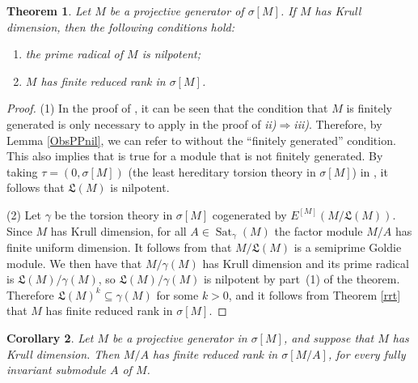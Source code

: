 \documentclass{amsart}
\newtheorem{thm}{Theorem}[section]
\newtheorem{cor}[thm]{Corollary}
\theoremstyle{definition}
\theoremstyle{remark}
\numberwithin{equation}{section}
\DeclareMathOperator{\Sat}{Sat}
\newcommand{\sm}{\sigma[M]}
\begin{document}
	\begin{thm}\label{Knil}
		Let $M$ be a projective generator of $\sm$. 
		If $M$ has Krull dimension,
		then the following conditions hold:
		\begin{enumerate}
			\item the prime radical of $M$ is nilpotent;
			\item $M$ has finite reduced rank in $\sm$.
		\end{enumerate}
	\end{thm}
	
	\begin{proof}
		(1)
		In the proof of \cite[Theorem 2.16]{Pepenil}, 
		it can be seen that the condition that $M$ is finitely generated 
		is only necessary to apply \cite[Lemma 2.14]{Pepenil} 
		in the proof of \textit{ii)}$\Rightarrow$\textit{iii)}. 
		Therefore, by Lemma \ref{ObsPPnil}, 
		we can refer to \cite[Theorem 2.16]{Pepenil} 
		without the ``finitely generated'' condition. 
		This also implies that \cite[Theorem 3.10]{Pepenil} 
		is true for a module that is not finitely generated. 
		By taking $\tau=(0,\sm)$ 
		(the least hereditary torsion theory in $\sm$) 
		in \cite[Theorem 3.10]{Pepenil}, 
		it follows that $\mathfrak{L} (M)$ is nilpotent.
		
		(2)
		Let $\gamma$ be the torsion theory in $\sm$ 
		cogenerated by $E^{[M]}(M/\mathfrak{L}(M))$. 
		Since $M$ has Krull dimension, 
		for all $A\in\Sat_\gamma(M)$ 
		the factor module $M/A$ has finite uniform dimension.
		It follows from \cite[Corollary 2.12]{maugoldie} 
		that $M/\mathfrak{L}(M)$ is a semiprime Goldie module. 
		We then have that $M/\gamma(M)$ has Krull dimension 
		and its prime radical is $\mathfrak{L}(M)/\gamma(M)$, 
		so $\mathfrak{L}(M)/\gamma(M)$ is nilpotent by part~(1) of the theorem. 
		Therefore $\mathfrak{L}(M)^k\subseteq \gamma(M)$ for some $k>0$, 
		and it follows from Theorem \ref{rrt} 
		that $M$ has finite reduced rank in $\sm$.
	\end{proof}
	
	\begin{cor}
		Let $M$ be a projective generator in $\sm$,
		and suppose that $M$ has Krull dimension. 
		Then $M/A$ has finite reduced rank in $\sigma[M/A]$, 
		for every fully invariant submodule $A$ of $M$.
	\end{cor}
	
\end{document}
